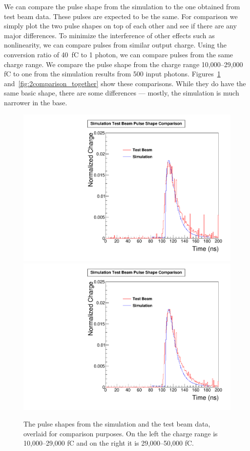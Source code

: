 We can compare the pulse shape from the simulation to the one obtained from test beam data. These pulses are expected to be the same. For comparison we simply plot the two pulse shapes on top of each other and see if there are any major differences. To minimize the interference of other effects such as nonlinearity, we can compare pulses from similar output charge. Using the conversion ratio of 40~fC to 1 photon, we can compare pulses from the same charge range. We compare the pulse shape from the charge range 10,000--29,000 fC to one from the simulation results from 500 input photons. Figures~\ref{fig:1comparison_together} and~\ref{fig:2comparison_together} show these comparisons. While they do have the same basic shape, there are some differences --- mostly, the simulation is much narrower in the base.

\begin{figure}
\centering
\includegraphics[width=0.495\linewidth]{Figures/10Comparison.pdf}
\includegraphics[width=0.495\linewidth]{Figures/29Comparison.pdf}
\caption{The pulse shapes from the simulation and the test beam data, overlaid for comparison purposes. On the left the charge range is 10,000--29,000 fC and on the right it is 29,000--50,000 fC.}
\label{fig:1comparison_together}
\end{figure}


